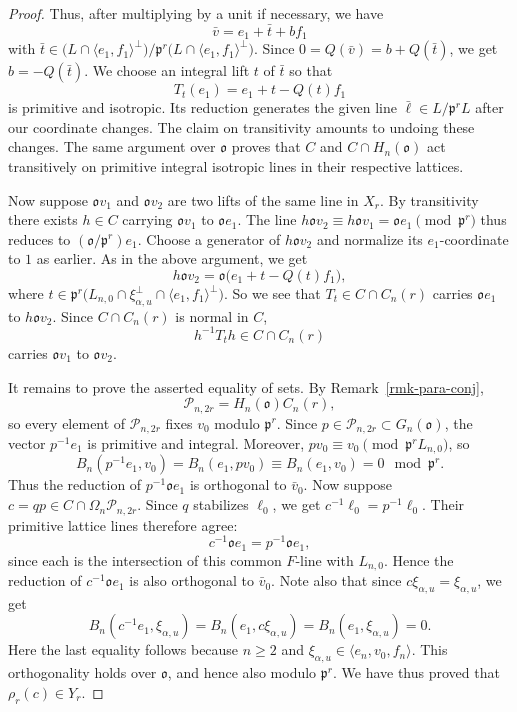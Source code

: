 \documentclass[12pt]{amsart}
\theoremstyle{definition}
\theoremstyle{remark}
\begin{document}
\begin{proof}
Thus, after multiplying by a unit if necessary, we have 
\[\bar{v} = e_1+\bar t+b f_1\]
with 
$\bar t\in
\bigl(L\cap\langle e_1,f_1\rangle^\perp\bigr)/
\mathfrak p^r\bigl(L\cap\langle e_1,f_1\rangle^\perp\bigr).
$
Since $0=Q(\bar{v})=b+Q(\bar{t})$, we get $b = -Q(\bar{t})$. We choose an integral lift $t$ of $\bar {t}$ so that 
\[
T_t(e_1)=e_1+t-Q(t)f_1
\]
is primitive and isotropic. Its reduction generates the given line $\bar{\ell} \in L/\mathfrak p^rL$ after our coordinate changes. The claim on transitivity amounts to undoing these changes. The same argument over $\mathfrak o$ proves that $C$ and $C\cap H_n(\mathfrak o)$ act transitively on primitive integral isotropic lines in their respective lattices.

Now suppose $\mathfrak o v_1$ and $\mathfrak o v_2$ are two lifts of the same line in $X_r$. By transitivity there exists $h\in C$ carrying $\mathfrak o v_1$ to $\mathfrak o e_1$. The line $h\mathfrak o v_2 \equiv h\mathfrak o v_1 = \mathfrak o e_1 \pmod{\mathfrak p^r}$ thus reduces to $(\mathfrak o/\mathfrak p^r)e_1$. Choose a generator of $h\mathfrak o v_2$ and normalize its $e_1$-coordinate to $1$ as earlier. As in the above argument, we get
\[
h\mathfrak o v_2
=\mathfrak o\bigl(e_1+t-Q(t)f_1\bigr),\]
where $t\in\mathfrak p^r
\bigl(L_{n,0}\cap\xi_{\alpha,u}^{\perp}
\cap\langle e_1,f_1\rangle^\perp\bigr)$.
So we see that $T_t\in C\cap C_n(r)$ carries $\mathfrak o e_1$ to $h\mathfrak o v_2$. Since $C\cap C_n(r)$ is normal in $C$,
\[
h^{-1}T_th\in C\cap C_n(r)
\]
carries $\mathfrak o v_1$ to $\mathfrak o v_2$.

It remains to prove the asserted equality of sets. By Remark~\ref{rmk-para-conj},
\[
\mathcal P_{n,2r}=H_n(\mathfrak o)C_n(r),
\]
so every element of $\mathcal P_{n,2r}$ fixes $v_0$ modulo $\mathfrak p^r$.
Since $p\in\mathcal P_{n,2r}\subset G_n(\mathfrak o)$, the vector $p^{-1}e_1$ is primitive and integral. Moreover, $pv_0\equiv v_0\pmod{\mathfrak p^rL_{n,0}}$, so
\[
B_n(p^{-1}e_1,v_0)
=B_n(e_1,pv_0)
\equiv B_n(e_1,v_0)=0
\mod{\mathfrak p^r}.
\]
Thus the reduction of $p^{-1}\mathfrak o e_1$ is orthogonal to $\bar{v}_0$. Now suppose 
$c=qp\in C\cap \Omega_n\mathcal P_{n,2r}$. Since $q$ stabilizes $\ell_0$,
we get $c^{-1}\ell_0=p^{-1}\ell_0$. Their primitive lattice lines therefore agree:
\[
c^{-1}\mathfrak o e_1=p^{-1}\mathfrak o e_1,
\]
since each is the intersection of this common $F$-line with $L_{n,0}$. Hence the reduction of $c^{-1}\mathfrak o e_1$ is also orthogonal to $\bar v_0$.
Note also that since $c\xi_{\alpha,u}=\xi_{\alpha,u}$, we get 
\[
B_n(c^{-1}e_1,\xi_{\alpha,u})
=B_n(e_1,c\xi_{\alpha,u})
=B_n(e_1,\xi_{\alpha,u})=0.
\]
Here the last equality follows because $n\ge2$ and $\xi_{\alpha,u}\in\langle e_n,v_0,f_n\rangle$. This orthogonality holds over $\mathfrak o$, and hence also modulo $\mathfrak p^r$. We have thus proved that $\rho_r(c) \in Y_r$.


\end{proof}
\end{document}
